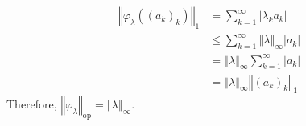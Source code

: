 \documentclass[8pt]{extarticle}
\newcommand{\norm}[1]{\left\Vert #1\right\Vert}
\begin{document}
\begin{enumerate}[(i)]
\begin{description}
          \begin{align*}
            \norm{\varphi_{\lambda}((a_k)_k)}_{1} &= \sum_{k=1}^{\infty}|\lambda_ka_k|\\
                                                  &\leq \sum_{k=1}^{\infty}\norm{\lambda}_{\infty}|a_k|\\
                                                  &= \norm{\lambda}_{\infty}\sum_{k=1}^{\infty}|a_k|\\
                                                  &= \norm{\lambda}_{\infty}\norm{(a_k)_k}_1
          \end{align*}
          Therefore, $\norm{\varphi_{\lambda}}_{\text{op}} = \norm{\lambda}_{\infty}$.
      \end{description}
  \end{enumerate}
\end{document}
